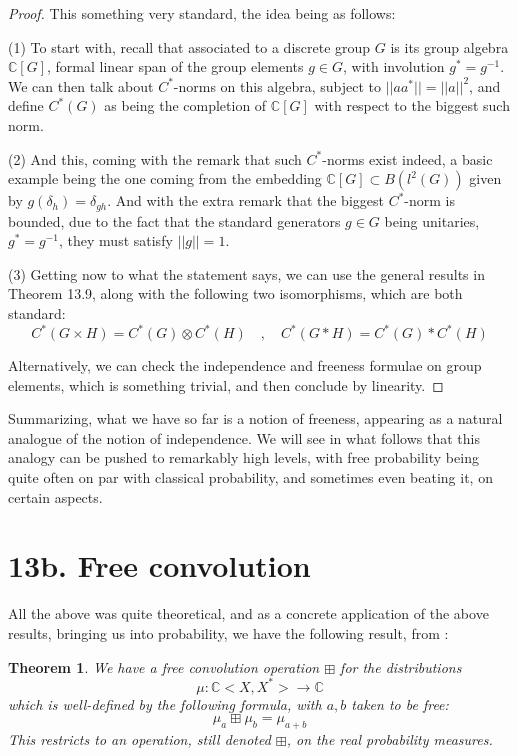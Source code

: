 \documentclass[12pt]{amsbook}
\newtheorem{theorem}{Theorem}[chapter]
\begin{document}
\begin{proof}
This something very standard, the idea being as follows:

\medskip

(1) To start with, recall that associated to a discrete group $G$ is its group algebra $\mathbb C[G]$, formal linear span of the group elements $g\in G$, with involution $g^*=g^{-1}$. We can then talk about $C^*$-norms on this algebra, subject to $||aa^*||=||a||^2$, and define $C^*(G)$ as being the completion of  $\mathbb C[G]$ with respect to the biggest such norm.

\medskip

(2) And this, coming with the remark that such $C^*$-norms exist indeed, a basic example being the one coming from the embedding $\mathbb C[G]\subset B(l^2(G))$ given by $g(\delta_h)=\delta_{gh}$. And with the extra remark that the biggest $C^*$-norm is bounded, due to the fact that the standard generators $g\in G$ being unitaries, $g^*=g^{-1}$, they must satisfy $||g||=1$.

\medskip

(3) Getting now to what the statement says, we can use the general results in Theorem 13.9, along with the following two isomorphisms, which are both standard:
$$C^*(G\times H)=C^*(G)\otimes C^*(H)\quad,\quad
C^*(G*H)=C^*(G)*C^*(H)$$

Alternatively, we can check the independence and freeness formulae on group elements, which is something trivial, and then conclude by linearity.
\end{proof}

Summarizing, what we have so far is a notion of freeness, appearing as a natural analogue of the notion of independence. We will see in what follows that this analogy can be pushed to remarkably high levels, with free probability being quite often on par with classical probability, and sometimes even beating it, on certain aspects.

\section*{13b. Free convolution}

All the above was quite theoretical, and as a concrete application of the above results, bringing us into probability, we have the following result, from \cite{vo1}:


\begin{theorem}
We have a free convolution operation $\boxplus$ for the distributions
$$\mu:\mathbb C<X,X^*>\to\mathbb C$$
which is well-defined by the following formula, with $a,b$ taken to be free:
$$\mu_a\boxplus\mu_b=\mu_{a+b}$$
This restricts to an operation, still denoted $\boxplus$, on the real probability measures.
\end{theorem}
\end{document}
